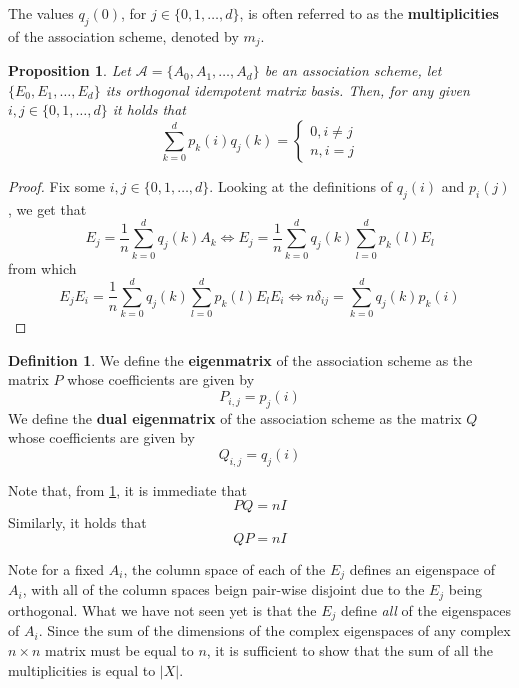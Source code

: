 \documentclass[a4paper,12pt]{article}
\theoremstyle{plain}
\newtheorem{proposition}[theorem]{Proposition}
\theoremstyle{definition}
\newtheorem{definition}[theorem]{Definition}
\theoremstyle{remark}
\begin{document}
The values $ q_j(0) $, for $ j \in \{ 0,1,\dots,d \} $, is often referred to as
the \textbf{multiplicities} of the association scheme, denoted by $ m_j $.

\begin{proposition}
    \label{prop:association_schemes_pq_identity}
    Let $ \mathcal{A} = \{ A_0, A_1, \dots, A_d \} $ be an association scheme,
    let $ \{ E_0, E_1, \dots, E_d \} $ its orthogonal idempotent matrix basis.
    Then, for any given $ i,j \in \{ 0,1,\dots,d \} $ it holds that
    \[ \sum_{ k=0 }^{ d } p_k(i) q_j(k) =
        \begin{cases}
            0, i \neq j \\
            n, i = j
        \end{cases}
    \]
\end{proposition}
\begin{proof}
    Fix some $ i,j \in \{ 0,1,\dots,d \} $. Looking at the definitions of
    $ q_j(i) $ and $ p_i(j) $, we get that
    \[
        E_j = \frac{1}{n} \sum_{ k=0 }^{ d } q_j(k) A_k \iff
        E_j = \frac{1}{n} \sum_{ k=0 }^{ d } q_j(k) \sum_{ l=0 }^{ d } p_k(l) E_l
    \]
    from which
    \[
        E_j E_i = \frac{1}{n} \sum_{ k=0 }^{ d } q_j(k) \sum_{ l=0 }^{ d }
            p_k(l) E_l E_i
        \iff
        n\delta_{ij} = \sum_{ k=0 }^{ d } q_j(k) p_k(i)
    \]
\end{proof}

\begin{definition}
    We define the \textbf{eigenmatrix} of the association scheme as the matrix
    $ P $ whose coefficients are given by
    \[ P_{i,j} = p_j(i) \]
    We define the \textbf{dual eigenmatrix} of the association scheme as the
    matrix $ Q $ whose coefficients are given by
    \[ Q_{i,j} = q_j(i) \]
\end{definition}

Note that, from \ref{prop:association_schemes_pq_identity}, it is immediate that
\begin{equation}
    PQ = nI
\end{equation}
Similarly, it holds that
\begin{equation}
    QP = nI
    \label{eq:QP_identity}
\end{equation}

Note for a fixed $ A_i $, the column space of each of
the $ E_j $ defines an eigenspace of $ A_i $,
with all of the column spaces beign pair-wise disjoint due to the $ E_j $ being
orthogonal. What we have not seen yet is that the $ E_j $ define \textit{all}
of the eigenspaces of $ A_i $. Since the sum of the dimensions of the complex
eigenspaces of any complex $ n\times n $ matrix must be equal to $ n $, it is
sufficient to show that the sum of all the multiplicities is equal to $ |X| $.
\end{document}
